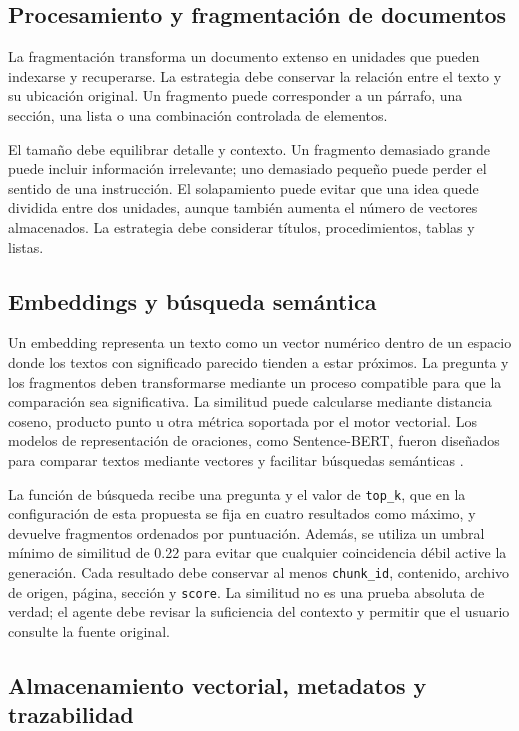 \subsection{Procesamiento y fragmentación de documentos}

La fragmentación transforma un documento extenso en unidades que pueden indexarse y recuperarse. La estrategia debe conservar la relación entre el texto y su ubicación original. Un fragmento puede corresponder a un párrafo, una sección, una lista o una combinación controlada de elementos.

El tamaño debe equilibrar detalle y contexto. Un fragmento demasiado grande puede incluir información irrelevante; uno demasiado pequeño puede perder el sentido de una instrucción. El solapamiento puede evitar que una idea quede dividida entre dos unidades, aunque también aumenta el número de vectores almacenados. La estrategia debe considerar títulos, procedimientos, tablas y listas.

\subsection{Embeddings y búsqueda semántica}

Un embedding representa un texto como un vector numérico dentro de un espacio donde los textos con significado parecido tienden a estar próximos. La pregunta y los fragmentos deben transformarse mediante un proceso compatible para que la comparación sea significativa. La similitud puede calcularse mediante distancia coseno, producto punto u otra métrica soportada por el motor vectorial. Los modelos de representación de oraciones, como Sentence-BERT, fueron diseñados para comparar textos mediante vectores y facilitar búsquedas semánticas \cite{reimers2019sbert}.

La función de búsqueda recibe una pregunta y el valor de \texttt{top\_k}, que en la configuración de esta propuesta se fija en cuatro resultados como máximo, y devuelve fragmentos ordenados por puntuación. Además, se utiliza un umbral mínimo de similitud de 0.22 para evitar que cualquier coincidencia débil active la generación. Cada resultado debe conservar al menos \texttt{chunk\_id}, contenido, archivo de origen, página, sección y \texttt{score}. La similitud no es una prueba absoluta de verdad; el agente debe revisar la suficiencia del contexto y permitir que el usuario consulte la fuente original.

\subsection{Almacenamiento vectorial, metadatos y trazabilidad}

